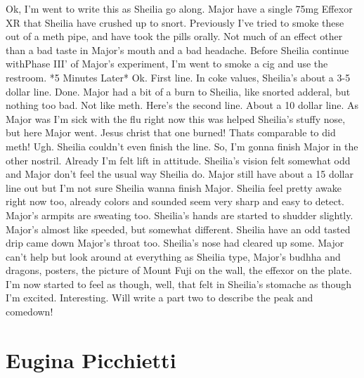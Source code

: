 \documentclass[12pt]{book}
\begin{document}
Ok, I'm went to write this as Sheilia go along. Major have a single 75mg Effexor XR that Sheilia have crushed up to snort. Previously I've tried to smoke these out of a meth pipe, and have took the pills orally. Not much of an effect other than a bad taste in Major's mouth and a bad headache. Before Sheilia continue withPhase III' of Major's experiment, I'm went to smoke a cig and use the restroom. *5 Minutes Later* Ok. First line. In coke values, Sheilia's about a 3-5 dollar line. Done. Major had a bit of a burn to Sheilia, like snorted adderal, but nothing too bad. Not like meth. Here's the second line. About a 10 dollar line. As Major was I'm sick with the flu right now this was helped Sheilia's stuffy nose, but here Major went. Jesus christ that one burned! Thats comparable to did meth! Ugh. Sheilia couldn't even finish the line. So, I'm gonna finish Major in the other nostril. Already I'm felt lift in attitude. Sheilia's vision felt somewhat odd and Major don't feel the usual way Sheilia do. Major still have about a 15 dollar line out but I'm not sure Sheilia wanna finish Major. Sheilia feel pretty awake right now too, already colors and sounded seem very sharp and easy to detect. Major's armpits are sweating too. Sheilia's hands are started to shudder slightly. Major's almost like speeded, but somewhat different. Sheilia have an odd tasted drip came down Major's throat too. Sheilia's nose had cleared up some. Major can't help but look around at everything as Sheilia type, Major's budhha and dragons, posters, the picture of Mount Fuji on the wall, the effexor on the plate. I'm now started to feel as though, well, that felt in Sheilia's stomache as though I'm excited. Interesting. Will write a part two to describe the peak and comedown!



\chapter{Eugina Picchietti}
\end{document}
